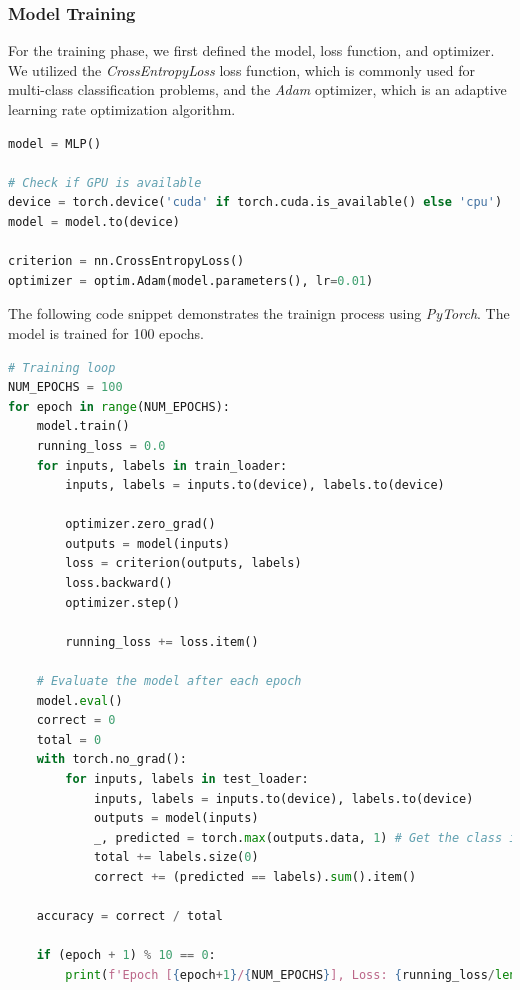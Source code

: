 \documentclass{article}
\begin{document}
\subsubsection{Model Training}
For the training phase, we first defined the model, loss function, and optimizer.
We utilized the \textit{CrossEntropyLoss} loss function, which is commonly used for multi-class classification problems, and the \textit{Adam} optimizer, which is an adaptive learning rate optimization algorithm.

\begin{lstlisting}[language=Python]
model = MLP()

# Check if GPU is available
device = torch.device('cuda' if torch.cuda.is_available() else 'cpu')
model = model.to(device)

criterion = nn.CrossEntropyLoss()
optimizer = optim.Adam(model.parameters(), lr=0.01)
\end{lstlisting}

The following code snippet demonstrates the trainign process using \textit{PyTorch}. The model is trained for 100 epochs.

\begin{lstlisting}[language=Python]
# Training loop
NUM_EPOCHS = 100
for epoch in range(NUM_EPOCHS):
    model.train()
    running_loss = 0.0
    for inputs, labels in train_loader:
        inputs, labels = inputs.to(device), labels.to(device)
        
        optimizer.zero_grad()
        outputs = model(inputs)
        loss = criterion(outputs, labels)
        loss.backward()
        optimizer.step()

        running_loss += loss.item()

    # Evaluate the model after each epoch
    model.eval()
    correct = 0
    total = 0
    with torch.no_grad():
        for inputs, labels in test_loader:
            inputs, labels = inputs.to(device), labels.to(device)
            outputs = model(inputs)
            _, predicted = torch.max(outputs.data, 1) # Get the class index with the highest probability
            total += labels.size(0)
            correct += (predicted == labels).sum().item()

    accuracy = correct / total

    if (epoch + 1) % 10 == 0:
        print(f'Epoch [{epoch+1}/{NUM_EPOCHS}], Loss: {running_loss/len(train_loader):.4f}, Accuracy: {accuracy * 100:.2f}%')
\end{lstlisting}
\end{document}
